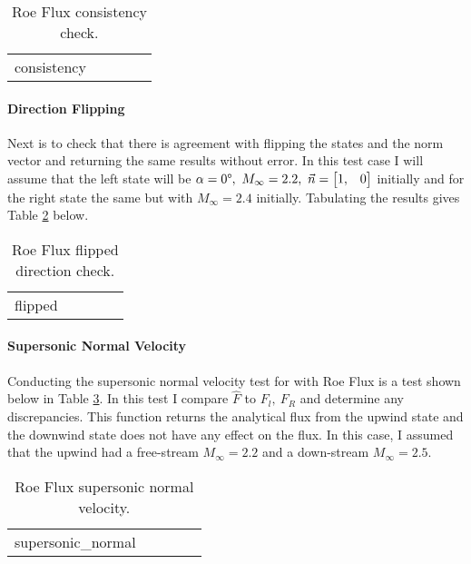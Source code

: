 \begin{table}[h]
    \centering
    \caption[Roe Flux Consistency Check]{Roe Flux consistency check.}
    \label{tab:roe_flux_consistency}
    \begin{tabular}{c|c|c|c|c}
        {consistency}
    \end{tabular}
\end{table}

\paragraph{Direction Flipping} Next is to check that there is agreement with flipping the states and the norm vector and returning the same results without error. In this test case I will assume that the left state will be $\alpha = 0\degree,\ M_\infty = 2.2,\ \vec{n} = \begin{bmatrix} 1, & 0 \end{bmatrix}$ initially and for the right state the same but with $M_\infty = 2.4$ initially. Tabulating the results gives Table \ref{tab:roe_flux_flipped} below.

\begin{table}[h]
    \centering
    \caption[Roe Flux Flipped Direction Check]{Roe Flux flipped direction check.}
    \label{tab:roe_flux_flipped}
    \begin{tabular}{c|c|c|c|c}
        {flipped}
    \end{tabular}
\end{table}


\paragraph{Supersonic Normal Velocity} Conducting the supersonic normal velocity test for with Roe Flux is a test shown below in Table \ref{tab:roe_flux_supersonic}. In this test I compare $\hat{F}$ to $F_l,\ F_R$ and determine any discrepancies. This function returns the analytical flux from the upwind state and the downwind state does not have any effect on the flux. In this case, I assumed that the upwind had a free-stream $M_\infty = 2.2$ and a down-stream $M_\infty = 2.5$. 


\begin{table}[h]
    \centering
    \caption[Roe Flux Supersonic Normal Velocity]{Roe Flux supersonic normal velocity.}
    \label{tab:roe_flux_supersonic}
    \begin{tabular}{c|c|c|c|c}
        {supersonic_normal}
    \end{tabular}
\end{table}